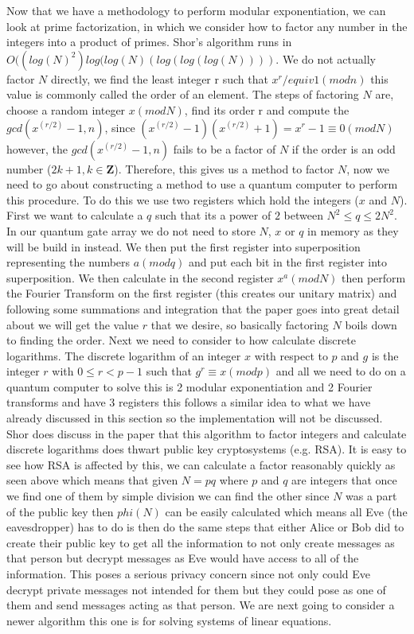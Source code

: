 \documentclass{article}
\begin{document}
Now that we have a methodology to perform modular exponentiation, we can look at prime factorization, in which we consider how to factor any number in the integers into a product of primes. Shor's algorithm runs in $O((log(N)^2)log(log(N)(log(log(log(N))))$. We do not actually factor $N$ directly, we find the least integer r such that $x^r /equiv 1 (mod n)$ this value is commonly called the order of an element. The steps of factoring $N$ are, choose a random integer $x(mod N)$, find its order r and compute the $gcd(x^(r/2) -1,n)$, since $(x^(r/2) -1)(x^(r/2) + 1) = x^r -1 \equiv 0 (mod N)$ however, the $gcd(x^(r/2) -1,n)$ fails to be a factor of $N$ if the order is an odd number ($2k+1, k\in \mathbf{Z}$). Therefore, this gives us a method to factor $N$, now we need to go about constructing a method to use a quantum computer to perform this procedure. To do this we use two registers which hold the integers ($x$ and $N$). First we want to calculate a $q$ such that its a power of $2$ between $N^2 \leq q \leq 2N^2$. In our quantum gate array we do not need to store $N$, $x$ or $q$ in memory as they will be build in instead. We then put the first register into superposition representing the numbers $a (mod q)$ and put each bit in the first register into superposition. We then calculate in the second register $x^a (mod N)$  then perform the Fourier Transform on the first register (this creates our unitary matrix) and  following some summations and integration that the paper goes into great detail about we will get the value $r$ that we desire, so basically factoring $N$ boils down to finding the order. Next we need to consider to how calculate discrete logarithms. The discrete logarithm of an integer $x$ with respect to $p$ and $g$ is the integer $r$ with $0 \leq r < p-1$ such that $g^r \equiv x (mod p)$ and all we need to do on a quantum computer to solve this is 2 modular exponentiation and 2 Fourier transforms and have 3 registers this follows a similar idea to what we have already discussed in this section so the implementation will not be discussed. Shor does discuss in the paper that this algorithm to factor integers and calculate discrete logarithms does thwart public key cryptosystems (e.g. RSA). It is easy to see how RSA is affected by this, we can calculate a factor reasonably quickly as seen above which means that given $N = pq$ where $p$ and $q$ are integers that once we find one of them by simple division we can find the other since $N$ was a part of the public key then $phi(N)$ can be easily calculated which means all Eve (the eavesdropper) has to do is then do the same steps that either Alice or Bob did to create their public key to get all the information to not only create messages as that person but decrypt messages as Eve would have access to all of the information. This poses a serious privacy concern since not only could Eve decrypt private messages not intended for them but they could pose as one of them and send messages acting as that person. We are next going to consider a newer algorithm this one is for solving systems of linear equations.
\end{document}
